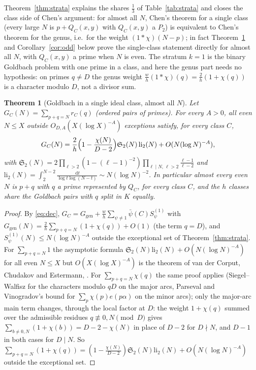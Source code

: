 ﻿\documentclass[11pt]{amsart}
\newtheorem{theorem}{Theorem}[section]
\theoremstyle{remark}
\newcommand{\sS}{\mathfrak S}
\newcommand{\dd}{\,\mathrm d}
\newcommand{\gen}{\mathrm{gen}}
\begin{document}
Theorem~\ref{thm:strata} explains the shares $\frac13$ of Table~\ref{tab:strata} and closes the class side of Chen's argument: for almost all $N$, Chen's theorem for a single class (every large $N$ is $p+Q_C(x,y)$ with $Q_C(x,y)$ a $P_2$) is equivalent to Chen's theorem for the genus, i.e.\ for the weight $(1*\chi)(N-p)$; in fact Theorem~\ref{thm:goldbach} and Corollary~\ref{cor:odd} below prove the single-class statement directly for almost all $N$, with $Q_C(x,y)$ a prime when $N$ is even. The stratum $k=1$ is the binary Goldbach problem with one prime in a class, and here the genus part needs no hypothesis: on primes $q\ne D$ the genus weight $\frac wh(1*\chi)(q)=\frac2h(1+\chi(q))$ is a character modulo $D$, not a divisor sum.

\begin{theorem}[Goldbach in a single ideal class, almost all $N$]\label{thm:goldbach}
Let $G_C(N)=\sum_{p+q=N}r_C(q)$ (ordered pairs of primes). For every $A>0$, all even $N\le X$ outside $O_{D,A}(X(\log X)^{-A})$ exceptions satisfy, for every class $C$,
\[
G_C(N)=\frac2h\Bigl(1-\frac{\chi(N)}{D-2}\Bigr)\sS_2(N)\,\mathrm{li}_2(N)+O(N(\log N)^{-A}),
\]
with $\sS_2(N)=2\prod_{\ell>2}(1-(\ell-1)^{-2})\prod_{\ell\mid N,\,\ell>2}\frac{\ell-1}{\ell-2}$ and $\mathrm{li}_2(N)=\int_2^{N-2}\frac{\dd t}{\log t\log(N-t)}\sim N(\log N)^{-2}$. In particular almost every even $N$ is $p+q$ with $q$ a prime represented by $Q_C$, for every class $C$, and the $h$ classes share the Goldbach pairs with $q$ split in $K$ equally.
\end{theorem}
\begin{proof}
By \eqref{eq:dec}, $G_C=G_\gen+\frac wh\sum_{\psi\ne1}\bar\psi(C)S^{(1)}_\psi$ with $G_\gen(N)=\frac2h\sum_{p+q=N}(1+\chi(q))+O(1)$ (the term $q=D$), and $S^{(1)}_\psi(N)\le N(\log N)^{-A}$ outside the exceptional set of Theorem~\ref{thm:strata}. For $\sum_{p+q=N}1$ the asymptotic formula $\sS_2(N)\mathrm{li}_2(N)+O(N(\log N)^{-A})$ for all even $N\le X$ but $O(X(\log X)^{-A})$ is the theorem of van der Corput, Chudakov and Estermann, \cite[Theorem~3.7]{Vaughan}. For $\sum_{p+q=N}\chi(q)$ the same proof applies (Siegel--Walfisz for the characters modulo $qD$ on the major arcs, Parseval and Vinogradov's bound for $\sum_p\chi(p)e(p\alpha)$ on the minor arcs); only the major-arc main term changes, through the local factor at $D$: the weight $1+\chi(q)$ summed over the admissible residues $q\not\equiv0,N\pmod D$ gives $\sum_{b\ne0,N}(1+\chi(b))=D-2-\chi(N)$ in place of $D-2$ for $D\nmid N$, and $D-1$ in both cases for $D\mid N$. So $\sum_{p+q=N}(1+\chi(q))=(1-\frac{\chi(N)}{D-2})\sS_2(N)\mathrm{li}_2(N)+O(N(\log N)^{-A})$ outside the exceptional set.
\end{proof}
\end{document}
